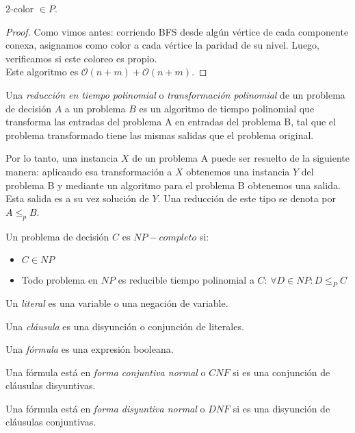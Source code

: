 \begin{proposition}
$2$-color $\in P$.
\end{proposition}

\begin{proof}
Como vimos antes: corriendo BFS desde algún vértice de cada componente conexa, asignamos como color a cada vértice la paridad de su nivel. Luego, verificamos si este coloreo es propio.\\
Este algoritmo es $\mathcal{O}(n+m) + \mathcal{O}(n+m)$.
\end{proof}

\begin{definition}
Una \emph{reducción en tiempo polinomial} o \emph{transformación polinomial} de un problema de decisión $A$ a un problema $B$ es un algoritmo de tiempo polinomial que transforma las entradas del problema A en entradas del problema B, tal que el problema transformado tiene las mismas salidas que el problema original.

Por lo tanto, una instancia $X$ de un problema A puede ser resuelto de la siguiente manera: aplicando esa transformación a $X$ obtenemos una instancia $Y$ del problema B y mediante un algoritmo para el problema B obtenemos una salida. Esta salida es a su vez solución de $Y$. 
Una reducción de este tipo se denota por $A \le_{p} B$.
\end{definition}

\begin{definition}[$NP-Completo$]
Un problema de decisión $C$ es \emph{$NP-completo$} si:
\begin{itemize}
    \item $C \in NP$
    \item Todo problema en $NP$ es reducible tiempo polinomial a $C$:
    $\forall D \in NP : D \le_{P} C$
\end{itemize}
\end{definition}

\begin{definition}
Un \emph{literal} es una variable o una negación de variable.

Una \emph{cláusula} es una disyunción o conjunción de literales.

Una \emph{fórmula} es una expresión booleana.

Una fórmula está en \emph{forma conjuntiva normal} o $CNF$ si es una conjunción de cláusulas disyuntivas.

Una fórmula está en \emph{forma disyuntiva normal} o $DNF$ si es una disyunción de cláusulas conjuntivas.
\end{definition}

